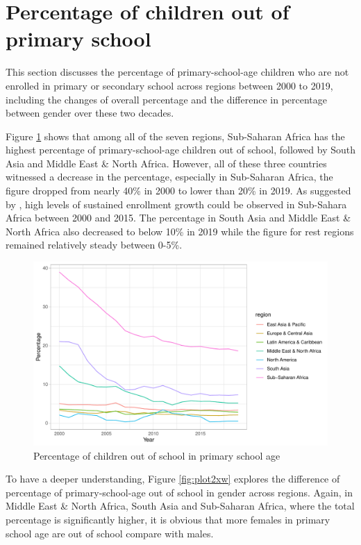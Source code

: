 \documentclass[11pt,a4paper,]{article}
\begin{document}
\section*{Percentage of children out of primary school}

This section discusses the percentage of primary-school-age children who are not enrolled in primary or secondary school across regions between 2000 to 2019, including the changes of overall percentage and the difference in percentage between gender over these two decades.

Figure \ref{fig:plot1xw} shows that among all of the seven regions, Sub-Saharan Africa has the highest percentage of primary-school-age children out of school, followed by South Asia and Middle East \& North Africa. However, all of these three countries witnessed a decrease in the percentage, especially in Sub-Saharan Africa, the figure dropped from nearly 40\% in 2000 to lower than 20\% in 2019. As suggested by \textcite{bennell2002hitting}, high levels of sustained enrollment growth could be observed in Sub-Sahara Africa between 2000 and 2015. The percentage in South Asia and Middle East \& North Africa also decreased to below 10\% in 2019 while the figure for rest regions remained relatively steady between 0-5\%.

\begin{figure}
\centering
\includegraphics{report_files/figure-latex/plot1xw-1.pdf}
\caption{\label{fig:plot1xw}Percentage of children out of school in primary school age}
\end{figure}

To have a deeper understanding, Figure \ref{fig:plot2xw} explores the difference of percentage of primary-school-age out of school in gender across regions. Again, in Middle East \& North Africa, South Asia and Sub-Saharan Africa, where the total percentage is significantly higher, it is obvious that more females in primary school age are out of school compare with males.
\end{document}
